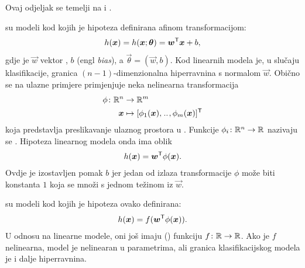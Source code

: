 \documentclass[utf8, diplomski, lmodern]{fer}
\begin{document}
Ovaj odjeljak se temelji na \citet[odjeljak 6.1]{Snajder:2014:SU} i \citet{Snajder:2017:SULR2}.

 su modeli kod kojih je hipoteza definirana afinom transformacijom:
\begin{align}
h(\vec x) = h(\vec x;\vec\theta) = \vec w^\tp\vec x + b \text{,}
\end{align}
gdje je $\vec w$ vektor , $b$  (engl \textit{bias}), a $\vec\theta=(\vec w, b)$. Kod linearnih modela je, u slučaju klasifikacije, granica $(n-1)$-dimenzionalna hiperravnina s normalom $\vec w$. Obično se na ulazne primjere primjenjuje neka nelinearna transformacija
\begin{align*}
\phi \colon \R^n &\to \R^m \\
\vec x &\mapsto \sbr{\phi_1(\vec x),\bidot,\phi_m(\vec x)}^\tp
\end{align*}
koja predstavlja preslikavanje ulaznog prostora u . Funkcije $\phi_i \colon \mathbb{R}^n \to \mathbb{R}$ nazivaju se . Hipoteza linearnog modela onda ima oblik
\begin{align}
h(\vec x) = \vec w^\tp\phi(\vec x) \text{.}
\end{align}
Ovdje je izostavljen pomak $b$ jer jedan od izlaza transformacije $\phi$ može biti konstanta $1$ koja se množi s jednom težinom iz $\vec w$. 

 su modeli kod kojih je hipoteza ovako definirana:
\begin{align} \label{eq:poopceni-linearni-model}
h(\vec x) = f(\vec w^\tp\phi(\vec x)) \text{.}
\end{align}
U odnosu na linearne modele, oni još imaju  () funkciju $f \colon \mathbb{R} \to \mathbb{R}$. Ako je $f$ nelinearna, model je nelinearan u parametrima, ali granica klasifikacijskog modela je i dalje hiperravnina.
\end{document}
